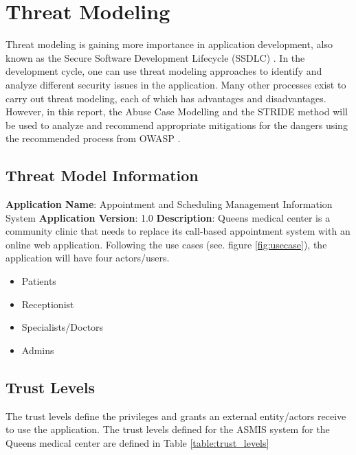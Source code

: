 \chapter{Threat Modeling}
Threat modeling is gaining more importance in application development, also known as the Secure Software Development Lifecycle (SSDLC) \citep{snyk_2022}. In the development cycle, one can use threat modeling approaches to identify and analyze different security issues in the application. Many other processes exist to carry out threat modeling, each of which has advantages and disadvantages. However, in this report, the Abuse Case Modelling and the STRIDE method will be used to analyze and recommend appropriate mitigations for the dangers using the recommended process from OWASP \citep{owasp_threat_model_process}.

\section{Threat Model Information}
\textbf{Application Name}: Appointment and Scheduling Management Information System
\textbf{Application Version}: 1.0 \newline
\textbf{Description}: Queens medical center is a community clinic that needs to replace its call-based appointment system with an online web application. Following the use cases (see. figure \ref{fig:usecase}), the application will have four actors/users.
\begin{itemize}
  \item Patients
  \item Receptionist
  \item Specialists/Doctors
  \item Admins
\end{itemize}

\newpage

\section{Trust Levels}
The trust levels define the privileges and grants an external entity/actors receive to use the application. The trust levels defined for the ASMIS system for the Queens medical center are defined in Table \ref{table:trust_levels}

